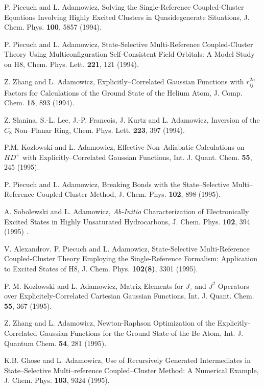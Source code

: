 \begin{thebibliography}{999}
P. Piecuch and L. Adamowicz, Solving the Single-Reference 
Coupled-Cluster Equations Involving
Highly Excited Clusters in Quasidegenerate Situations, 
J. Chem. Phys. {\bf 100}, 5857 (1994).

P. Piecuch and L. Adamowicz, State-Selective 
Multi-Reference Coupled-Cluster Theory Using
Multiconfiguration Self-Consistent Field Orbitals:  A 
Model Study on H8, Chem. Phys. Lett. {\bf 221}, 121
(1994).

  Z. Zhang and L. Adamowicz, Explicitly--Correlated 
Gaussian Functions with $r_{ij}^{2n}$ Factors for Calculations
of the Ground State of the Helium Atom, J. Comp. Chem. 
{\bf 15}, 893 (1994).

Z. Slanina, S.-L. Lee, J.-P. Francois, J. Kurtz 
and L. Adamowicz, Inversion of the $C_8$ Non--Planar Ring,
Chem. Phys. Lett. {\bf 223}, 397 (1994).

  P.M. Kozlowski and L. Adamowicz, Effective 
Non--Adiabatic Calculations on $HD^{+}$ with 
Explicitly--Correlated Gaussian Functions, 
Int. J. Quant. Chem. {\bf 55}, 245 (1995).

P. Piecuch and L. Adamowicz, Breaking 
Bonds with the State--Selective Multi--Reference Coupled-Cluster 
Method, J. Chem. Phys. {\bf 102}, 898 (1995).

A. Sobolewski  and L. Adamowicz, {\it Ab-Initio} 
Characterization of Electronically Excited States in
Highly Unsaturated Hydrocarbons, J. Chem. Phys. 
{\bf 102}, 394 (1995) .

V. Alexandrov. P. Piecuch and L. Adamowicz, 
State-Selective Multi-Reference Coupled-Cluster Theory
Employing the Single-Reference Formalism:  Application 
to Excited States of H8, J. Chem. Phys.
{\bf 102(8)}, 3301 (1995).

P. M. Kozlowski and L. Adamowicz, Matrix Elements 
for  $J_z$ and $J^2$  Operators over Explicitely-Correlated
Cartesian Gaussian Functions, 
Int. J. Quant. Chem. {\bf 55}, 367 (1995).

Z. Zhang and L. Adamowicz, Newton-Raphson Optimization 
of the Explicitly-Correlated Gaussian
Functions for the Ground State of the Be Atom, 
Int. J. Quantum Chem.  {\bf 54}, 281 (1995).

K.B. Ghose and L. Adamowicz, Use of Recursively 
Generated Intermediates in State--Selective
Multi--reference Coupled--Cluster Method:  
A Numerical Example, J. Chem. Phys. {\bf 103}, 9324 (1995).


\end{thebibliography}

